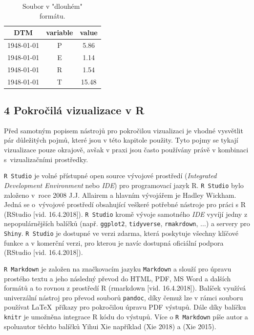 \documentclass[12pt,]{article}
\begin{document}
\begin{minipage}[c]{0.39\textwidth}
\begin{table}[H]
\begin{tabular}{|ccc|}
  \hline
DTM & variable & value \\ 
  \hline
1948-01-01 & P & 5.86 \\ 
1948-01-01 & E & 1.14 \\ 
1948-01-01 & R & 1.54 \\ 
1948-01-01 & T & 15.48 \\ 
   \hline
\end{tabular}
\caption{Soubor v "dlouhém" \\ formátu.}
\label{tab4}
\end{table}
\end{minipage}

\newpage

\hypertarget{pokrocila}{\subsection{4 Pokročilá vizualizace v
R}\label{pokrocila}}

\qquad Před samotným popisem nástrojů pro pokročilou vizualizaci je
vhodné vysvětlit pár důležitých pojmů, které jsou v této kapitole
použity. Tyto pojmy se tykají vizualizace pouze okrajově, avšak v praxi
jsou často používány právě v kombinaci s~vizualizačními prostředky.

\qquad \texttt{R\ Studio} je volné přístupné open source vývojové
prostředí (\emph{Integrated Development Environment} nebo \emph{IDE})
pro programovací jazyk R. \texttt{R\ Studio} bylo založeno v~roce 2008
J.J. Allairem a hlavním vývojářem je Hadley Wickham. Jedná se o~vývojové
prostředí obsahující veškeré potřebné nástroje pro práci s R (RStudio
{[}vid. 16.4.2018{]}). \texttt{R\ Studio} kromě vývoje samotného
\emph{IDE} vyvíjí jedny z nepopulárnějších balíčků (např.
\texttt{ggplot2}, \texttt{tidyverse}, \texttt{rmakrdown}, \(\dots\)) a
servery pro \texttt{Shiny}. \texttt{R\ Studio} je dostupné ve verzi
zdarma, která poskytuje všechny klíčové funkce a v komerční verzi, pro
kterou je navíc dostupná oficiální podpora (RStudio {[}vid.
16.4.2018{]}).

\qquad \texttt{R\ Markdown} je založen na značkovacím jazyku
\texttt{Markdown} a slouží pro úpravu prostého textu a jeho následný
převod do HTML, PDF, MS Word a dalších formátů a to rovnou z prostředí R
(rmarkdown {[}vid. 16.4.2018{]}). Balíček využívá univerzální nástroj
pro převod souborů \texttt{pandoc}, díky čemuž lze v rámci souboru
používat \LaTeX ~příkazy pro pokročilou úpravu PDF výstupů. Dále díky
balíčku \texttt{knitr} je umožněna integrace R kódu do výstupů. Více o
\texttt{R\ Markdown} píše autor a spoluautor těchto balíčků Yihui Xie
například (Xie 2018) a (Xie 2015).
\end{document}

